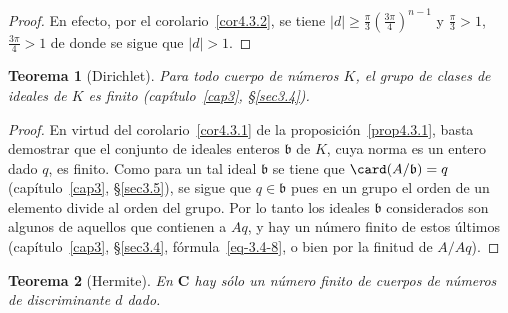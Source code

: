 \documentclass[oneside,bibtotoc,leqno,spanish]{amsbook}
\newcommand{\CC}{\mathbf{C}}
\newcommand{\idl}[1]{\mathfrak{#1}}
\newcommand{\QED}{}%
\newcommand{\abs}[1]{\left\lvert#1\right\rvert}
\numberwithin{equation}{section}
\theoremstyle{defi}
\theoremstyle{note}
\newtheorem{theorem}{Teorema}
\theoremstyle{rem}
\numberwithin{theorem}{section}
\numberwithin{proposition}{section}
\numberwithin{definition}{section}
\numberwithin{lemma}{section}
\numberwithin{corollary}{section}
\numberwithin{example}{section}
\numberwithin{footnote}{section}%
\begin{document}
\begin{proof}
En efecto, por el corolario~\ref{cor4.3.2}, se tiene $\abs{d}\geq\frac{\pi}{3}\left(\frac{3\pi}{4}\right)^{n-1}$ y
$\frac{\pi}{3} >1$, $\frac{3\pi}{4} > 1$ de donde se sigue que $\abs{d} > 1$.
\end{proof}

\begin{theorem}[Dirichlet]\label{teo4.3.2}
Para todo cuerpo de n\'umeros $K$, el grupo de clases de ideales de $K$ es finito (cap\'itulo~\ref{cap3}, \S\ref{sec3.4}).
\end{theorem}

\begin{proof}
En virtud del corolario~\ref{cor4.3.1} de la proposici\'on~\ref{prop4.3.1},
basta demostrar que el conjunto de ideales enteros $\idl{b}$
de $K$, cuya norma es un entero dado $q$, es finito. Como para un tal ideal $\idl{b}$ se tiene que
$\card(A/\idl{b}) = q$ (cap\'itulo~\ref{cap3}, \S\ref{sec3.5}), se sigue que $q\in\idl{b}$ pues en un grupo el orden de un elemento
divide al orden del grupo. Por lo tanto los ideales $\idl{b}$ considerados son algunos de aquellos que contienen
a $Aq$, y hay un n\'umero finito de estos \'ultimos (cap\'itulo~\ref{cap3}, \S\ref{sec3.4}, f\'ormula~\eqref{eq-3.4-8},
o bien por la finitud de
$A/Aq$).%
\end{proof}

\begin{theorem}[Hermite]\label{teo4.3.3}
En $\CC$ hay s\'olo un n\'umero finito de cuerpos de n\'umeros de discriminante $d$ dado.
\end{theorem}
\end{document}
